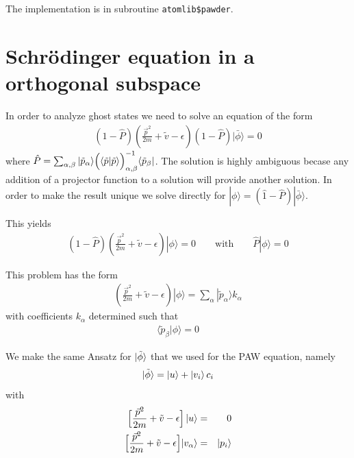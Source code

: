 \documentclass[11pt,a4paper]{report}
\begin{document}
The implementation is in subroutine \verb|atomlib$pawder|.

\section{Schr\"odinger equation in a orthogonal subspace}
\label{app:schrortho}
In order to analyze ghost states we need to solve an equation of the
form
\begin{eqnarray}
(1-\hat{P})\left(\frac{\vec{p}^2}{2m}+\tilde{v}-\epsilon\right)(1-\hat{P})
|\bar{\phi}\rangle=0
\end{eqnarray}
where $\hat{P}=\sum_{\alpha,\beta}|\tilde{p}_\alpha\rangle
\Bigl(\langle\tilde{p}|\tilde{p}\rangle\Bigl)^{-1}_{\alpha,\beta}
\langle\tilde{p}_\beta|$.  The solution is highly ambiguous becase any
addition of a projector function to a solution will provide another
solution. In order to make the result unique we solve directly for
$|\phi\rangle=(\hat{1}-\hat{P})|\bar{\phi}\rangle$.

This yields
\begin{eqnarray}
(1-\hat{P})\left(\frac{\vec{p}^2}{2m}+\tilde{v}-\epsilon\right)|\phi\rangle=0
\qquad\text{with}\qquad\hat{P}|\phi\rangle=0
\end{eqnarray}

This problem has the form
\begin{eqnarray}
\left(\frac{\vec{p}^2}{2m}+\tilde{v}-\epsilon\right)|\phi\rangle
=\sum_\alpha |\tilde{p}_\alpha\rangle k_\alpha
\label{eq:orthodefeq1}
\end{eqnarray}
with coefficients $k_\alpha$ determined such that
\begin{eqnarray}
\langle\tilde{p}_\beta|\phi\rangle=0
\label{eq:orthodefeq2}
\end{eqnarray}

We make the same Ansatz for $\ket{\tilde{\phi}}$ that we used for the
PAW equation, namely
\begin{equation}
\ket{\tilde{\phi}}=\ket{u}+\ket{v_i}c_i
\label{eq:orthogonalradeqansatz}
\end{equation}
with
\begin{eqnarray}
\Bigl\lbrack
\frac{\vec{p}^2}{2m}+\tilde{v}-\epsilon
\Bigr\rbrack \ket{u} &=& 0
\\
\Bigl\lbrack
\frac{\vec{p}^2}{2m}+\tilde{v}-\epsilon
\Bigr\rbrack |v_\alpha\rangle& =& |p_i\rangle
\end{eqnarray}
\end{document}
